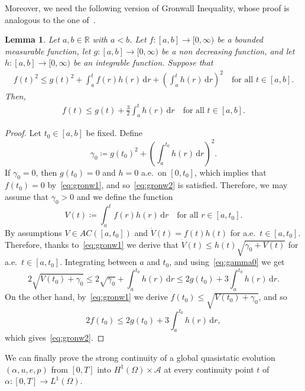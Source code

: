 \documentclass[reqno]{amsart}
\newtheorem{lemma}[corollary]{Lemma}
\theoremstyle{definition}
\numberwithin{equation}{section}
\def\de {\mathrm{d}}
\def\R {\mathbb R}
\begin{document}
Moreover, we need the following version of Gronwall Inequality, whose proof is analogous to the one of~\cite[Lemma 5.3]{DMDSMo}.

\begin{lemma}\label{lem:gronw}
Let $a,b\in\R$ with $a<b$. Let $f\colon [a,b]\to [0,\infty)$ be a bounded measurable function, let $g\colon [a,b]\to [0,\infty)$ be a non decreasing function, and let $h\colon [a,b]\to [0,\infty)$ be an integrable function. Suppose that
\begin{align}\label{eq:gronw1}
f(t)^2\le g(t)^2+\int_a^tf(r)h(r)\,\de r+\left(\int_a^t h(r)\,\de r\right)^2\quad\text{for all $t\in[a,b]$}.
\end{align}
Then, 
\begin{align}\label{eq:gronw2}
f(t)\le g(t)+\frac{3}{2}\int_a^th(r)\,\de r\quad\text{for all $t\in[a,b]$}.    
\end{align}
\end{lemma}

\begin{proof}
Let $t_0\in[a,b]$ be fixed. Define
\begin{equation}\label{eq:gamma0}
\gamma_0\coloneqq g(t_0)^2+\left(\int_a^{t_0} h(r)\,\de r\right)^2.    
\end{equation}
If $\gamma_0=0$, then $g(t_0)=0$ and $h=0$ a.e.\ on $[0,t_0]$, which implies that $f(t_0)=0$ by~\eqref{eq:gronw1}, and so~\eqref{eq:gronw2} is satisfied. Therefore, we may assume that $\gamma_0>0$ and we define the function
$$V(t)\coloneqq\int_a^tf(r)h(r)\,\de r\quad\text{for all $r\in[a,t_0]$}.$$
By assumptions $V\in AC([a,t_0])$ and $\dot{V}(t)=f(t)h(t)$ for a.e.\ $t\in[a,t_0]$. Therefore, thanks to~\eqref{eq:gronw1} we derive that $\dot{V}(t)\le h(t)\sqrt{\gamma_0+V(t)}$ for a.e.\ $t\in[a,t_0]$. Integrating between $a$ and $t_0$, and using~\eqref{eq:gamma0} we get
$$2\sqrt{V(t_0)+\gamma_0}\le 2\sqrt{\gamma_0}+\int_a^{t_0}h(r)\,\de r\le 2g(t_0)+3\int_a^{t_0}h(r)\,\de r.$$
On the other hand, by~\eqref{eq:gronw1} we derive
$f(t_0)\le \sqrt{V(t_0)+\gamma_0}$, and so 
$$2f(t_0)\le 2g(t_0)+3\int_a^{t_0}h(r)\,\de r,$$
which gives~\eqref{eq:gronw2}.
\end{proof}

We can finally prove the strong continuity of a global quasistatic evolution $(\alpha,u,e,p)$ from $[0,T]$ into $H^1(\Omega)\times \mathcal A$ at every continuity point $t$ of $\alpha\colon [0,T]\to L^1(\Omega)$. 
\end{document}
